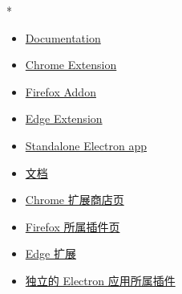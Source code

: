 \begin{paracol}{2}
 
\switchcolumn[0]*%
\begin{itemize}
\item
  \href{https://devtools.vuejs.org/}{Documentation}
\item
  \href{https://chrome.google.com/webstore/detail/vuejs-devtools/nhdogjmejiglipccpnnnanhbledajbpd}{Chrome
  Extension}
\item
  \href{https://addons.mozilla.org/en-US/firefox/addon/vue-js-devtools/}{Firefox
  Addon}
\item
  \href{https://microsoftedge.microsoft.com/addons/detail/vuejs-devtools/olofadcdnkkjdfgjcmjaadnlehnnihnl}{Edge
  Extension}
\item
  \href{https://devtools.vuejs.org/guide/installation.html\#standalone}{Standalone
  Electron app}
\end{itemize}
\switchcolumn
\begin{itemize}
\item
  \href{https://devtools.vuejs.org/}{文档}
\item
  \href{https://chrome.google.com/webstore/detail/vuejs-devtools/nhdogjmejiglipccpnnnanhbledajbpd}{Chrome
  扩展商店页}
\item
  \href{https://addons.mozilla.org/en-US/firefox/addon/vue-js-devtools/}{Firefox
  所属插件页}
\item
  \href{https://microsoftedge.microsoft.com/addons/detail/vuejs-devtools/olofadcdnkkjdfgjcmjaadnlehnnihnl}{Edge
  扩展}
\item
  \href{https://devtools.vuejs.org/guide/installation.html\#standalone}{独立的
  Electron 应用所属插件}
\end{itemize}
\end{paracol}

